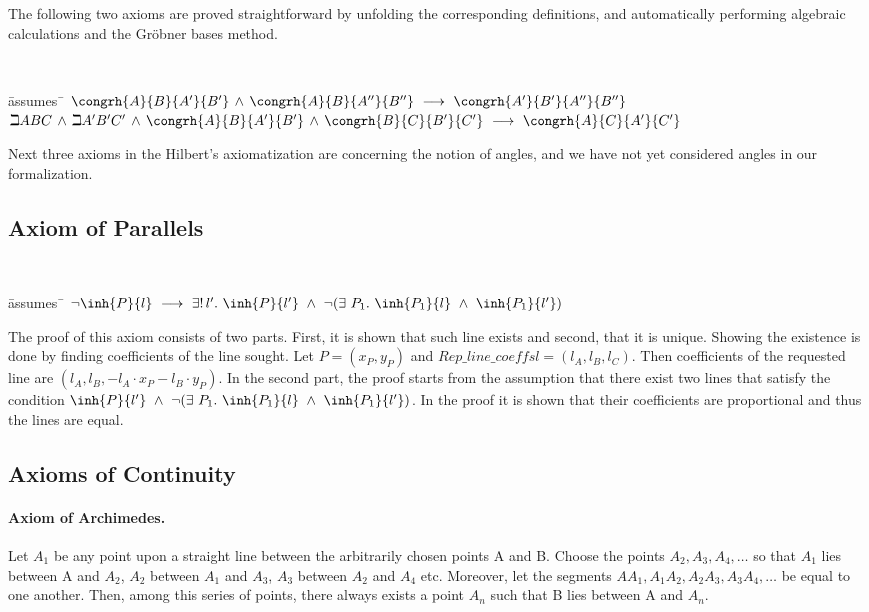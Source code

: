 The following two axioms are proved straightforward by unfolding the
corresponding definitions, and automatically performing algebraic
calculations and the Gr\"obner bases method.

{\tt
\begin{tabbing}
\hspace{5mm}\=assumes\ \=\kill
$\congrh{A}{B}{A'}{B'}\,\wedge\,\congrh{A}{B}{A''}{B''}\ \longrightarrow\ \congrh{A'}{B'}{A''}{B''}$\\
$\beth{A}{B}{C}\,\wedge\,\beth{A'}{B'}{C'}\,\wedge\,\congrh{A}{B}{A'}{B'}\,\wedge\,\congrh{B}{C}{B'}{C'} \ \longrightarrow\ \congrh{A}{C}{A'}{C'}$
\end{tabbing}
}

Next three axioms in the Hilbert's axiomatization are concerning the
notion of angles, and we have not yet considered angles in our
formalization.


\subsection{Axiom of Parallels}

{\tt
\begin{tabbing}
\hspace{5mm}\=assumes\ \=\kill
$\neg \inh{P}{l} \ \longrightarrow\ \exists!\,l'.\ \inh{P}{l'}\ \wedge\ \neg (\exists\ P_1.\ \inh{P_1}{l}\ \wedge\  \inh{P_1}{l'})$
\end{tabbing}
}

The proof of this axiom consists of two parts. First, it is shown that
such line exists and second, that it is unique.  Showing the existence
is done by finding coefficients of the line sought.  Let $P = (x_P,
y_P)$ and $\mathit{Rep\_line\_coeffs} l = (l_A, l_B, l_C)$.  Then
coefficients of the requested line are $(l_A, l_B, -l_A\cdot x_P -
l_B\cdot y_P)$. In the second part, the proof starts from the
assumption that there exist two lines that satisfy the condition
$\inh{P}{l'}\ \wedge\ \neg (\exists\ P_1.\ \inh{P_1}{l}\ \wedge\  \inh{P_1}{l'})$. In
the proof it is shown that their coefficients are proportional and
thus the lines are equal.

\subsection{Axioms of Continuity}

\paragraph{Axiom of Archimedes.}
Let $A_1$ be any point upon a straight line between the arbitrarily
chosen points A and B.  Choose the points $A_2, A_3, A_4, \ldots$ so
that $A_1$ lies between A and $A_2$, $A_2$ between $A_1$ and $A_3$,
$A_3$ between $A_2$ and $A_4$ etc. Moreover, let the segments $AA_1,
A_1A_2, A_2A_3, A_3A_4, \ldots$ be equal to one another. Then, among
this series of points, there always exists a point $A_n$ such that B
lies between A and $A_n$.

